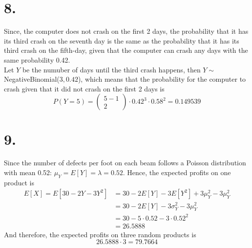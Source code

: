 \documentclass[11pt]{article}
\begin{document}
\section*{8.}
Since, the computer does not crash on the first 2 days, the probability that it has its third crash on the seventh day is the same as the probability that it has its third crash on the fifth-day, given that the computer can crash any days with the same probability 0.42. \\
Let $Y$ be the numuber of days until the third crash happens, then $Y \sim $ NegativeBinomial($3,0.42$), which means that the probability for the computer to crash given that it did not crash on the first 2 days is 
\[
P(Y=5) = \begin{pmatrix} 5-1 \\ 2 \end{pmatrix} \cdot 0.42^3 \cdot 0.58^2 = 0.149539
\]
\pagebreak
\section*{9.}
Since the number of defects per foot on each beam follows a Poisson distribution with mean 0.52:
$\mu_Y = E[Y] = \lambda = 0.52$. Hence, the expected profits on one product is 
\begin{equation*}
\begin{aligned}
E[X] = E[30-2Y-3Y^2] &= 30 - 2E[Y] - 3E[Y^2] + 3\mu_Y^2 - 3\mu_Y^2 \\
&= 30 - 2E[Y] - 3 \sigma_Y^2 - 3\mu_Y^2 \\
&= 30 - 5 \cdot 0.52 - 3 \cdot 0.52^2 \\
&= 26.5888
\end{aligned}
\end{equation*}
And therefore, the expected profits on three random products is
\[
26.5888 \cdot 3 = 79.7664
\]
\pagebreak
\end{document}
